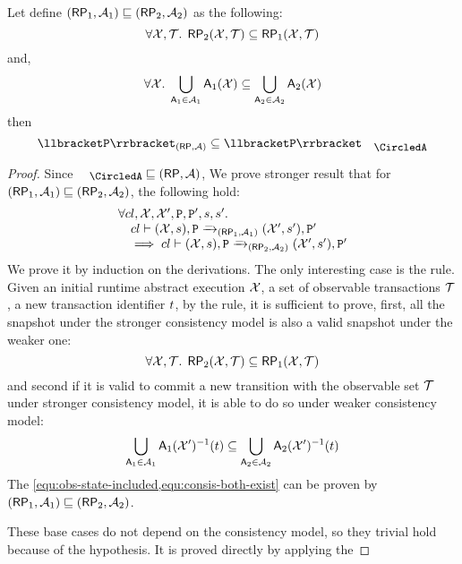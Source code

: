 \begin{proposition}
\label{prop:aexec-semantics-mono}
Let define \( (\mathsf{RP}_1, \mathcal{A}_1) \sqsubseteq (\mathsf{RP}_2, \mathcal{A}_2) \) as the following:
\[
    \forall \mathcal{X},\mathcal{T} \ldotp \; \mathsf{RP}_2(\mathcal{X},\mathcal{T}) \subseteq \mathsf{RP}_1(\mathcal{X},\mathcal{T})
\]
and,
\[
    \forall \mathcal{X} \ldotp \; \bigcup\limits_{\mathsf{A}_1 \in \mathcal{A}_1}\mathsf{A}_1(\mathcal{X}) \subseteq \bigcup\limits_{\mathsf{A}_2 \in \mathcal{A}_2}\mathsf{A}_2(\mathcal{X})
\]
then
\[ \interpr{\prog}_{(\RP, \Ax)} \subseteq \interpr{\prog}_{\anarchic} \]
\end{proposition}
\begin{proof}
    Since \( \anarchic \sqsubseteq (\RP, \Ax) \),
    We prove stronger result that for \( (\mathsf{RP}_1, \mathcal{A}_1) \sqsubseteq  (\mathsf{RP}_2, \mathcal{A}_2)\),
    the following  hold:
    \[
        \begin{array}{@{}l@{}}
            \fora{\cl, \aexec, \aexec', \prog, \prog', \stk, \stk'}  \\
            \quad \cl \vdash ( \aexec, \stk ), \prog \toA{\stub}_{(\RP_1, \Ax_1)} ( \aexec', \stk' ), \prog' \\
            \quad \implies \cl \vdash ( \aexec, \stk ), \prog \toA{\stub}_{(\RP_2, \Ax_2)} ( \aexec', \stk' ), \prog' \\
        \end{array}
    \]
    We prove it by induction on the derivations.
    The only interesting case is the  rule.
    Given an initial runtime abstract execution \( \mathcal{X} \),
    a set of observable transactions \( \mathcal{T} \),
    a new transaction identifier \( t \),
    by the  rule, it is sufficient to prove, 
    first, all the snapshot under the stronger consistency model is also a valid snapshot under the weaker one:
    \begin{equation}
        \label{equ:obs-state-included}
        \forall \mathcal{X},\mathcal{T} \ldotp \; \mathsf{RP}_2(\mathcal{X},\mathcal{T}) \subseteq  \mathsf{RP}_1(\mathcal{X},\mathcal{T})
    \end{equation}
    and second if it is valid  to commit a new transition with the observable set \( \mathcal{T} \) under stronger consistency model,
    it is able to do so under weaker consistency model:
    \begin{equation}
        \label{equ:consis-both-exist}
        \bigcup\limits_{\mathsf{A}_1 \in \mathcal{A}_1}\mathsf{A}_1(\mathcal{X}')^{-1}(t) \subseteq \bigcup\limits_{\mathsf{A}_2 \in \mathcal{A}_2}\mathsf{A}_2(\mathcal{X}')^{-1}(t)
    \end{equation}
    The \cref{equ:obs-state-included,equ:consis-both-exist} can be proven by \( (\mathsf{RP}_1, \mathcal{A}_1) \sqsubseteq  (\mathsf{RP}_2, \mathcal{A}_2) \).

    These base cases do not depend on the consistency model, so they trivial hold because of the hypothesis.
    It is proved directly by applying the \ih
\end{proof}
